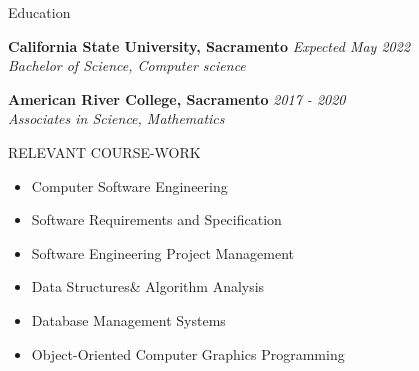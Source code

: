 \documentclass{resume} %
\begin{document}

\begin{rSection}{Education}

{\bf  California State University, Sacramento } \hfill {\em Expected May 2022} 
\\{ \textit {Bachelor of Science, Computer science}} 

{\bf American River College, Sacramento} \hfill {\em 2017 - 2020} 
\\ { \textit {Associates in Science, Mathematics}} \hfill
\end{rSection}


\begin{rSection}{RELEVANT COURSE-WORK}
\begin{multicols}{3}
\begin{itemize}

  \item Computer Software Engineering
  \item Software Requirements and Specification
  \item Software Engineering Project Management
  \item Data Structures\& Algorithm Analysis
  \item Database Management Systems
  \item Object-Oriented Computer Graphics Programming
 
\end{itemize}
\end{multicols}
\end{rSection}
\end{document}
